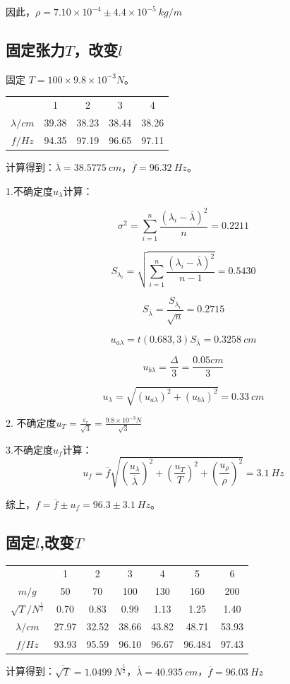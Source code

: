 \documentclass{article}
\begin{document}
因此，$\rho=7.10\times 10^{-4}\pm 4.4\times 10^{-5}\ kg/m$
\subsection{固定张力$T$，改变$l$}
固定 $T=100\times9.8\times 10^{-3} N$。

\begin{table}[ht]
    \centering
    \begin{tabular}{ccccc}
    \hline \hline
              & 1  &  2    &  3    &   4   \\
    $\lambda/cm$ &39.38 &38.23 &38.44 &38.26  \\ 
    $f/Hz$    & 94.35 &97.19&96.65&97.11\\\hline \hline
    \end{tabular}
\end{table}
计算得到：$\overline{\lambda}=38.5775\ cm$，$\overline{f}=96.32\ Hz$。

1.不确定度$u_\lambda$计算：

$$
\sigma ^2=\sum_{i=1}^{n}\frac{(\lambda_i-\overline{\lambda})^2}{n}=0.2211
$$

$$
S_{\lambda_i}=\sqrt{\sum_{i=1}^{n}\frac{(\lambda_i-\overline{\lambda})^2}{n-1}}=0.5430
$$

$$
S_{\overline{\lambda}}=\frac{S_{\lambda_i}}{\sqrt{n}}=0.2715
$$

$$
u_{a\lambda}=t(0.683,3)S_{\overline{\lambda}}=0.3258\ cm
$$

$$
u_{b\lambda}=\frac{\Delta}{3}=\frac{0.05cm}{3}
$$

$$
u_\lambda=\sqrt{(u_{a\lambda})^2+(u_{b\lambda})^2}=0.33\ cm
$$

2. 不确定度$u_T=\frac{\varepsilon_r}{\sqrt3}=\frac{9.8\times 10^{-3}N}{\sqrt{3}}$

3.不确定度$u_f$计算：
$$
u_f=\overline{f}\sqrt{(\frac{u_\lambda}{\overline{\lambda}})^2+(\frac{u_T}{T})^2+(\frac{u_\rho}{\rho})^2}=3.1\ Hz
$$

综上，$f=\overline{f}\pm u_f=96.3\pm 3.1\ Hz$。

\subsection{固定$l$,改变$T$}

\begin{table}[ht]
    \centering
    \begin{tabular}{ccccccc}
    \hline \hline
              & 1  &  2    &  3    &   4 & 5 &6   \\
    $m/g$&50&70&100&130&160&200\\
    $\sqrt{T}/N^{\frac 12}$ &0.70&0.83&0.99&1.13&1.25&1.40\\
    $\lambda/cm$ &27.97&32.52&38.66&43.82&48.71&53.93\\ 
    $f/Hz$    & 93.93&95.59&96.10&96.67&96.484&97.43\\\hline \hline
    \end{tabular}
\end{table}
计算得到：$\overline{\sqrt{T}}=1.0499\ N^{\frac 12}$，$\overline{\lambda}=40.935\ cm$，$\overline{f}=96.03\ Hz$
\end{document}
